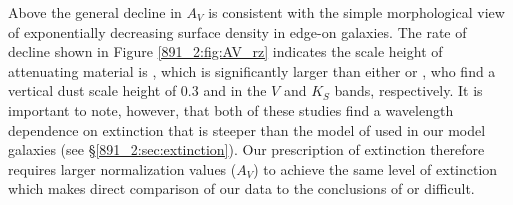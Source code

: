 


Above  the general decline in $A_V$ is consistent with
the simple morphological view of exponentially decreasing surface
density in edge-on galaxies. The rate of decline shown in Figure
\ref{891_2:fig:AV_rz} indicates the scale height of attenuating material is
, which is significantly larger than either
\citet{Xilouris99} or \citet{Schechtman-Rook12}, who find a vertical
dust scale height of 0.3 and  in the $V$ and $K_S$
bands, respectively. It is important to note, however, that both of
these studies find a wavelength dependence on extinction that is
steeper than the model of \citet{Charlot00} used in our model galaxies
(see \S\ref{891_2:sec:extinction}). Our prescription of extinction therefore
requires larger normalization values ($A_V$) to achieve the same level
of extinction which makes direct comparison of our data to the
conclusions of \citet{Xilouris99} or \citet{Schechtman-Rook12}
difficult.


